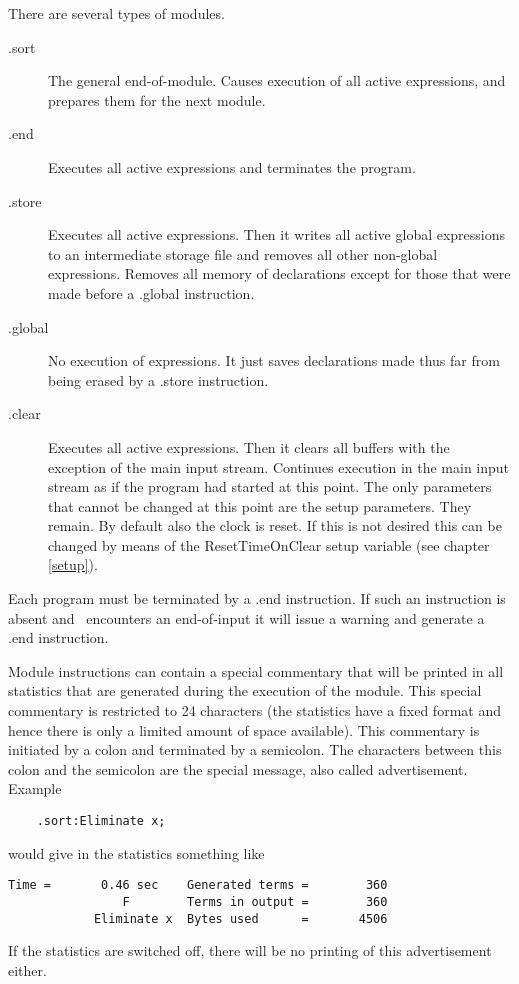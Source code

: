There are several types of modules.
\begin{description}
\item[.sort] \label{instrsort} The general end-of-module. 
Causes execution of all active expressions, and prepares them for the next 
module.
\item[.end] \label{instrend} Executes all active expressions 
and terminates the program.
\item[.store] \label{instrstore} Executes all active 
expressions. Then it writes all active global expressions to an 
intermediate storage file and removes all other 
non-global expressions. Removes all memory of declarations except for those 
that were made before a .global instruction.
\item[.global] \label{instrglobal} No execution of 
expressions. It just saves declarations made thus far from being erased by 
a .store instruction.
\item[.clear] \label{instrclear} Executes all active 
expressions. Then it clears all buffers with the exception of the main 
input stream. Continues execution in the main input stream as if the 
program had started at this point. The only parameters that cannot be 
changed at this point are the setup parameters. They remain. By default 
also the clock is reset. If this is not desired this can be 
changed by means of the ResetTimeOnClear setup 
variable (see chapter \ref{setup}).
\end{description}
Each program must be terminated by a .end instruction. If such an 
instruction is absent and \FORM\ encounters an end-of-input it will issue a 
warning and generate a .end instruction.

Module instructions can contain a special commentary that will be printed 
in all statistics that are generated during the execution of the module. 
This special commentary is restricted to 24 characters (the statistics have 
a fixed format and hence there is only a limited amount of space 
available). This commentary is initiated by a colon and terminated by a 
semicolon. The characters between this colon and the semicolon are the 
special message, also called advertisement. Example
\begin{verbatim}
	.sort:Eliminate x;
\end{verbatim}
would give in the statistics something like
\begin{verbatim}
Time =       0.46 sec    Generated terms =        360
                F        Terms in output =        360
            Eliminate x  Bytes used      =       4506
\end{verbatim}
If the statistics are switched off, there will be no printing of this 
advertisement either.

